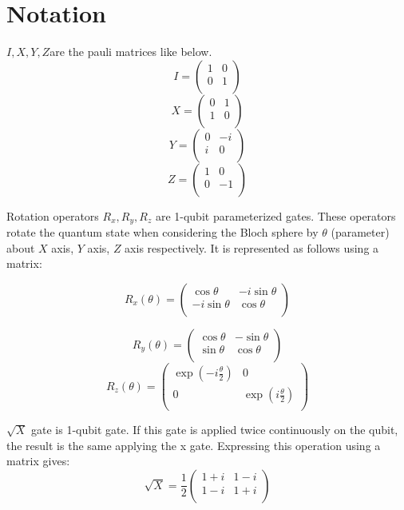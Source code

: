\section{Notation}
\par $I, X, Y, Z$are the pauli matrices like below.
$$I=
\begin{pmatrix}
1 & 0\\
0 & 1\\
\end{pmatrix}$$
$$X=
\begin{pmatrix}
0 & 1\\
1 & 0\\
\end{pmatrix}$$
$$Y=
\begin{pmatrix}
0 & -i\\
i & 0\\
\end{pmatrix}$$
$$Z=
\begin{pmatrix}
1 & 0\\
0 & -1\\
\end{pmatrix}$$
\par Rotation operators $R_x, R_y, R_z$ are 1-qubit parameterized gates. These operators rotate the quantum state when considering the Bloch sphere by $\theta$ (parameter) about $X$ axis, $Y$ axis, $Z$ axis respectively. It is represented as follows using a matrix:

$$R_x(\theta)=\begin{pmatrix}
\cos{\theta} & -i\sin{\theta}\\
-i\sin{\theta} & \cos{\theta}\\
\end{pmatrix}$$

$$R_y(\theta)=\begin{pmatrix}
\cos{\theta} & -\sin{\theta}\\
\sin{\theta} & \cos{\theta}\\
\end{pmatrix}$$
$$R_z(\theta)=\begin{pmatrix}
\exp{\left(-i\frac{\theta}{2}\right)} & 0\\
0 & \exp{\left(i\frac{\theta}{2}\right)}\\
\end{pmatrix}$$

\par $\sqrt{X}$ gate is 1-qubit gate. If this gate is applied twice continuously on the qubit, the result is the same applying the x gate. Expressing this operation using a matrix gives:
$$\sqrt{X}=\frac{1}{2}
\begin{pmatrix}
1+i & 1-i\\
1-i & 1+i\\
\end{pmatrix}$$

